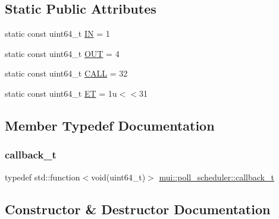 \subsection*{Static Public Attributes}
\begin{DoxyCompactItemize}
\item 
static const uint64\+\_\+t \hyperlink{classmui_1_1poll__scheduler_a2f3010dc0a5127b8daab44b0a04e95f7}{IN} = 1
\item 
static const uint64\+\_\+t \hyperlink{classmui_1_1poll__scheduler_ad3f840d4998ade0582bd21b703662bba}{O\+UT} = 4
\item 
static const uint64\+\_\+t \hyperlink{classmui_1_1poll__scheduler_a9bc1780ca268a4613f981b9d3f9a69f6}{C\+A\+LL} = 32
\item 
static const uint64\+\_\+t \hyperlink{classmui_1_1poll__scheduler_a8dd2bb944219f587bf2ff7bc789f8ae9}{ET} = 1u$<$$<$31
\end{DoxyCompactItemize}


\subsection{Member Typedef Documentation}
\mbox{\label{classmui_1_1poll__scheduler_af5bd0cf1190776e89355d42aebb0a45f}} 
\subsubsection{\texorpdfstring{callback\+\_\+t}{callback\_t}}
{\footnotesize\ttfamily typedef std\+::function$<$void(uint64\+\_\+t)$>$ \hyperlink{classmui_1_1poll__scheduler_af5bd0cf1190776e89355d42aebb0a45f}{mui\+::poll\+\_\+scheduler\+::callback\+\_\+t}}



\subsection{Constructor \& Destructor Documentation}
\mbox{\label{classmui_1_1poll__scheduler_a8c6f972559ee20b171d613d056bd0373}} 
